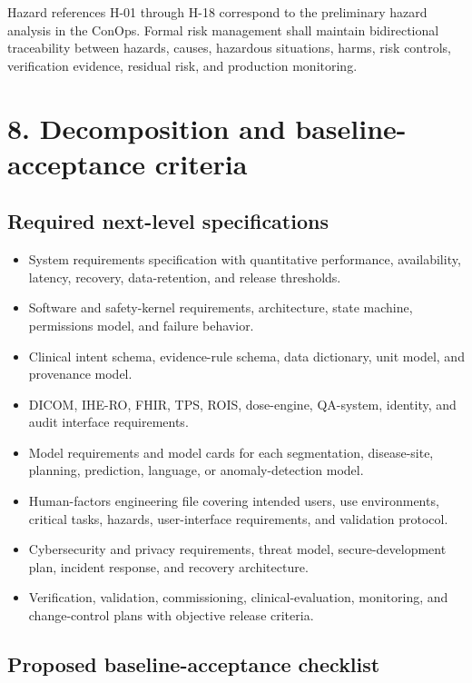 \documentclass[11pt,letterpaper]{article}
\begin{document}
Hazard references H-01 through H-18 correspond to the preliminary hazard analysis in the ConOps. Formal risk management shall maintain bidirectional traceability between hazards, causes, hazardous situations, harms, risk controls, verification evidence, residual risk, and production monitoring.

\section{8. Decomposition and baseline-acceptance criteria}

\subsection{Required next-level specifications}

\begin{itemize}
\item System requirements specification with quantitative performance, availability, latency, recovery, data-retention, and release thresholds.
\item Software and safety-kernel requirements, architecture, state machine, permissions model, and failure behavior.
\item Clinical intent schema, evidence-rule schema, data dictionary, unit model, and provenance model.
\item DICOM, IHE-RO, FHIR, TPS, ROIS, dose-engine, QA-system, identity, and audit interface requirements.
\item Model requirements and model cards for each segmentation, disease-site, planning, prediction, language, or anomaly-detection model.
\item Human-factors engineering file covering intended users, use environments, critical tasks, hazards, user-interface requirements, and validation protocol.
\item Cybersecurity and privacy requirements, threat model, secure-development plan, incident response, and recovery architecture.
\item Verification, validation, commissioning, clinical-evaluation, monitoring, and change-control plans with objective release criteria.
\end{itemize}

\subsection{Proposed baseline-acceptance checklist}
\end{document}
